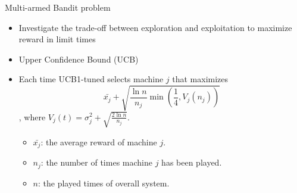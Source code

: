 \begin{frame}{Multi-armed Bandit problem}
  \begin{itemize}
    \item Investigate the trade-off between exploration and exploitation
      to maximize reward in limit times
      \vspace*{14pt}
    \item Upper Confidence Bound (UCB)
      \vspace*{14pt}
    \item Each time UCB1-tuned selects machine $j$ that maximizes
\[\bar{x_j} + \sqrt{\frac{\ln{n}}{n_j}
          \min(\frac{1}{4},V_j(n_j))}\], where $V_j(t) =\sigma_j^2 +
          \sqrt{\frac{2\ln n}{n_j}}$.

      \begin{itemize}
        \item $\bar{x_j}$: the average reward of machine $j$.
        \item $n_j$: the number of times machine $j$ has been played.
        \item $n$: the played times of overall system.
      \end{itemize} 
  \end{itemize}
\end{frame}

